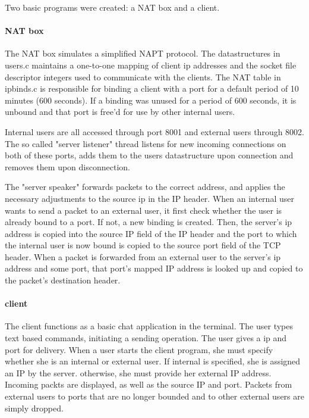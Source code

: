 \documentclass{article}
\begin{document}
Two basic programs were created: a NAT box and a client.  

\paragraph{NAT box} The NAT box simulates a simplified NAPT protocol.  The datastructures in users.c maintains a one-to-one mapping of client ip addresses and the socket file descriptor integers used to communicate with the clients.  The NAT table in ipbinds.c is responsible for binding a client with a port for a default period of 10 minutes (600 seconds).  If a binding was unused for a period of 600 seconds, it is unbound and that port is free'd for use by other internal users. 

Internal users are all accessed through port 8001 and external users through 8002.  The so called "server listener" thread listens for new incoming connections on both of these ports, adds them to the users datastructure upon connection and removes them upon disconnection.  

The "server speaker" forwards packets to the correct address, and applies the necessary adjustments to the source ip in the IP header.  When an internal user wants to send a packet to an external user, it first check whether the user is already bound to a port.  If not, a new binding is created.  Then, the server's ip address is copied into the source IP field of the IP header and the port to which the internal user is now bound is copied to the source port field of the TCP header.  When a packet is forwarded from an external user to the server's ip address and some port, that port's mapped IP address is looked up and copied to the packet's destination header.  

\paragraph{client}
The client functions as a basic chat application in the terminal.  The user types text based commands, initiating a sending operation.  The user gives a ip and port for delivery.  When a user starts the client program, she must specify whether she is an internal or external user.  If internal is specified, she is assigned an IP by the server.  otherwise, she must provide her external IP address.  Incoming packts are displayed, as well as the source IP and port. Packets from external users to ports that are no longer bounded and to other external users are simply dropped. 
\end{document}
